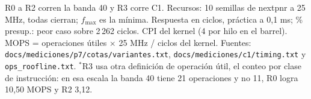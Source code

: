 {\footnotesize R0 a R2 corren la banda 40 y R3 corre C1. Recursos: 10 semillas de nextpnr a 25 MHz, todas cierran; $f_{\max}$ es la mínima. Respuesta en ciclos, práctica a 0,1 ms; \% presup.: peor caso sobre 2\,262 ciclos. CPI del kernel (4 por hilo en el barrel). MOPS = operaciones útiles $\times$ 25 MHz / ciclos del kernel. Fuentes: \texttt{docs/mediciones/p7/cotas/variantes.txt}, \texttt{docs/mediciones/c1/timing.txt} y \texttt{ops\_roofline.txt}. $^*$R3 usa otra definición de operación útil, el conteo por clase de instrucción: en esa escala la banda 40 tiene 21 operaciones y no 11, R0 logra 10{,}50 MOPS y R2 3{,}12.\par}
